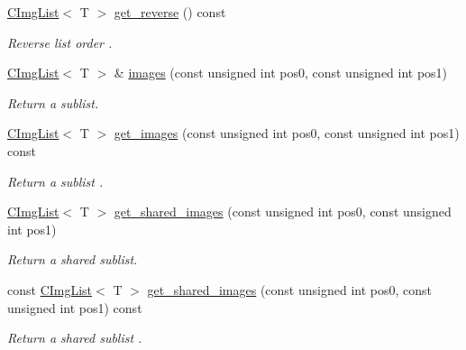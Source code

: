 \begin{Indent}
\begin{DoxyCompactItemize}
\hyperlink{structcimg__library__suffixed_1_1CImgList}{C\+Img\+List}$<$ T $>$ \hyperlink{structcimg__library__suffixed_1_1CImgList_adc6a452ffc83cdb5652f807d3470e931}{get\+\_\+reverse} () const
\begin{DoxyCompactList}\small\item\em Reverse list order . \end{DoxyCompactList}\item 
\hyperlink{structcimg__library__suffixed_1_1CImgList}{C\+Img\+List}$<$ T $>$ \& \hyperlink{structcimg__library__suffixed_1_1CImgList_a1a45c7e6d307a716e71f0070ced8b195}{images} (const unsigned int pos0, const unsigned int pos1)
\begin{DoxyCompactList}\small\item\em Return a sublist. \end{DoxyCompactList}\item 
\mbox{\label{structcimg__library__suffixed_1_1CImgList_a0e6faec8870636554173cb235ce90202}} 
\hyperlink{structcimg__library__suffixed_1_1CImgList}{C\+Img\+List}$<$ T $>$ \hyperlink{structcimg__library__suffixed_1_1CImgList_a0e6faec8870636554173cb235ce90202}{get\+\_\+images} (const unsigned int pos0, const unsigned int pos1) const
\begin{DoxyCompactList}\small\item\em Return a sublist . \end{DoxyCompactList}\item 
\hyperlink{structcimg__library__suffixed_1_1CImgList}{C\+Img\+List}$<$ T $>$ \hyperlink{structcimg__library__suffixed_1_1CImgList_a1a54d7eef89663fdcc5ffb61ed9a48b5}{get\+\_\+shared\+\_\+images} (const unsigned int pos0, const unsigned int pos1)
\begin{DoxyCompactList}\small\item\em Return a shared sublist. \end{DoxyCompactList}\item 
\mbox{\label{structcimg__library__suffixed_1_1CImgList_a53f24b1aa8ca0c6d472dedb84b5799af}} 
const \hyperlink{structcimg__library__suffixed_1_1CImgList}{C\+Img\+List}$<$ T $>$ \hyperlink{structcimg__library__suffixed_1_1CImgList_a53f24b1aa8ca0c6d472dedb84b5799af}{get\+\_\+shared\+\_\+images} (const unsigned int pos0, const unsigned int pos1) const
\begin{DoxyCompactList}\small\item\em Return a shared sublist . \end{DoxyCompactList}\item 

\end{DoxyCompactItemize}
\end{Indent}
